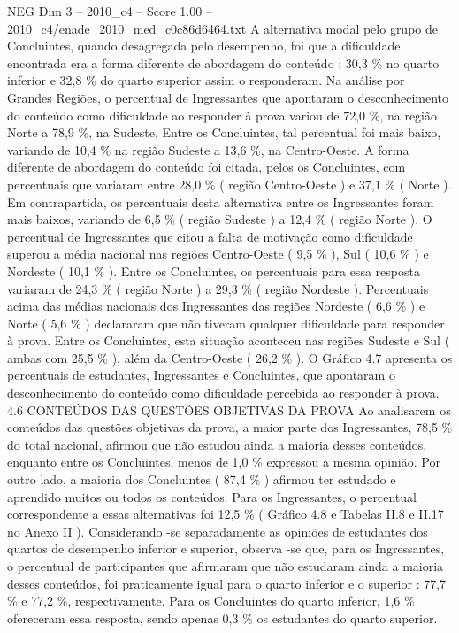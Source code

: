 \begin{textsample}{NEG Dim 3 – 2010\_c4 – Score 1.00 – 2010\_c4/enade\_2010\_med\_c0c86d6464.txt}
A alternativa modal pelo grupo de Concluintes, quando desagregada pelo desempenho, foi que a dificuldade encontrada era a forma diferente de abordagem do conteúdo : 30,3 \% no quarto inferior e 32,8 \% do quarto superior assim o responderam.
Na análise por Grandes Regiões, o percentual de Ingressantes que apontaram o desconhecimento do conteúdo como dificuldade ao responder à prova variou de 72,0 \%, na região Norte a 78,9 \%, na Sudeste.
Entre os Concluintes, tal percentual foi mais baixo, variando de 10,4 \% na região Sudeste a 13,6 \%, na Centro-Oeste.
A forma diferente de abordagem do conteúdo foi citada, pelos os Concluintes, com percentuais que variaram entre 28,0 \% ( região Centro-Oeste ) e 37,1 \% ( Norte ).
Em contrapartida, os percentuais desta alternativa entre os Ingressantes foram mais baixos, variando de 6,5 \% ( região Sudeste ) a 12,4 \% ( região Norte ).
O percentual de Ingressantes que citou a falta de motivação como dificuldade superou a média nacional nas regiões Centro-Oeste ( 9,5 \% ), Sul ( 10,6 \% ) e Nordeste ( 10,1 \% ).
Entre os Concluintes, os percentuais para essa resposta variaram de 24,3 \% ( região Norte ) a 29,3 \% ( região Nordeste ).
Percentuais acima das médias nacionais dos Ingressantes das regiões Nordeste ( 6,6 \% ) e Norte ( 5,6 \% ) declararam que não tiveram qualquer dificuldade para responder à prova.
Entre os Concluintes, esta situação aconteceu nas regiões Sudeste e Sul ( ambas com 25,5 \% ), além da Centro-Oeste ( 26,2 \% ).
O Gráfico 4.7 apresenta os percentuais de estudantes, Ingressantes e Concluintes, que apontaram o desconhecimento do conteúdo como dificuldade percebida ao responder à prova. 4.6 CONTEÚDOS DAS QUESTÕES OBJETIVAS DA PROVA Ao analisarem os conteúdos das questões objetivas da prova, a maior parte dos Ingressantes, 78,5 \% do total nacional, afirmou que não estudou ainda a maioria desses conteúdos, enquanto entre os Concluintes, menos de 1,0 \% expressou a mesma opinião.
Por outro lado, a maioria dos Concluintes ( 87,4 \% ) afirmou ter estudado e aprendido muitos ou todos os conteúdos.
Para os Ingressantes, o percentual correspondente a essas alternativas foi 12,5 \% ( Gráfico 4.8 e Tabelas II.8 e II.17 no Anexo II ).
Considerando -se separadamente as opiniões de estudantes dos quartos de desempenho inferior e superior, observa -se que, para os Ingressantes, o percentual de participantes que afirmaram que não estudaram ainda a maioria desses conteúdos, foi praticamente igual para o quarto inferior e o superior : 77,7 \% e 77,2 \%, respectivamente.
Para os Concluintes do quarto inferior, 1,6 \% ofereceram essa resposta, sendo apenas 0,3 \% os estudantes do quarto superior.

\end{textsample}
